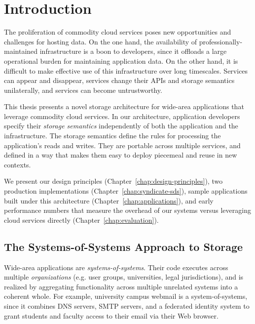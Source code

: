 \chapter{Introduction}
\label{chap:introduction}

The proliferation of commodity cloud services poses new opportunities and
challenges for hosting data.  On the one hand, the availability of
professionally-maintained infrastructure is a boon to developers, since it
offloads a large operational burden for maintaining application data.  On the other
hand, it is difficult to make effective use of this infrastructure over long
timescales.  Services can appear and disappear, services change their APIs and
storage semantics unilaterally, and services can become untrustworthy.

This thesis presents a novel storage architecture for wide-area applications
that leverage commodity cloud services.  In our architecture,
application developers specify their \emph{storage semantics} independently of
both the application and the infrastructure.  The storage semantics define the
rules for processing the application's reads and writes.  They are portable
across multiple services, and defined in a way that makes them easy to deploy
piecemeal and reuse in new contexts.

We present our design principles (Chapter~\ref{chap:design-principles}),
two production implementations (Chapter~\ref{chap:syndicate-sds}), sample
applications built under this architecture (Chapter~\ref{chap:applications}),
and early performance numbers that measure the overhead of our systems versus
leveraging cloud services directly (Chapter~\ref{chap:evaluation}).

\section{The Systems-of-Systems Approach to Storage}

Wide-area applications are \emph{systems-of-systems}.  Their code
executes across multiple \emph{organizations} (e.g. user groups, universities,
legal jurisdictions), and is realized by aggregating
functionality across multiple unrelated systems into a coherent whole.
For example, university campus webmail is a system-of-systems, since it combines DNS
servers, SMTP servers, and a federated identity system to grant students and
faculty access to their email via their Web browser.

